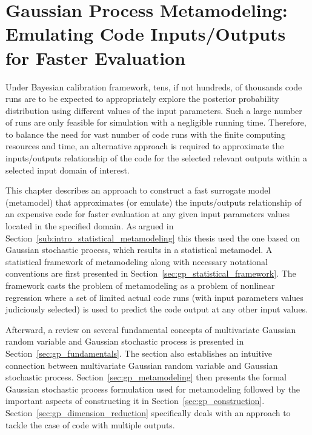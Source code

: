 \chapter[Gaussian Process Metamodeling]{Gaussian Process Metamodeling: Emulating Code Inputs/Outputs for Faster Evaluation}\label{ch:gp_metamodel}

Under Bayesian calibration framework, tens, if not hundreds, of thousands code runs are to be expected to appropriately explore the posterior probability distribution using different values of the input parameters.
Such a large number of runs are only feasible for simulation with a negligible running time.
Therefore, to balance the need for vast number of code runs with the finite computing resources and time, 
an alternative approach is required to approximate the inputs/outputs relationship of the code for the selected relevant outputs within a selected input domain of interest. 

This chapter describes an approach to construct a fast surrogate model (metamodel) that approximates (or emulate) the inputs/outputs relationship of an expensive code for faster evaluation at any given input parameters values located in the specified domain.
As argued in Section~\ref{sub:intro_statistical_metamodeling} this thesis used the one based on Gaussian stochastic process, which results in a statistical metamodel. 
A statistical framework of metamodeling along with necessary notational conventions are first presented in Section~\ref{sec:gp_statistical_framework}.
The framework casts the problem of metamodeling as a problem of nonlinear regression where a set of limited actual code runs (with input parameters values judiciously selected) is used to predict the code output at any other input values.

Afterward, a review on several fundamental concepts of multivariate Gaussian random variable and Gaussian stochastic process is presented in Section~\ref{sec:gp_fundamentals}.
The section also establishes an intuitive connection between multivariate Gaussian random variable and Gaussian stochastic process.
Section~\ref{sec:gp_metamodeling} then presents the formal Gaussian stochastic process formulation used for metamodeling followed by the important aspects of constructing it in Section~\ref{sec:gp_construction}.
Section~\ref{sec:gp_dimension_reduction} specifically deals with an approach to tackle the case of code with multiple outputs.

